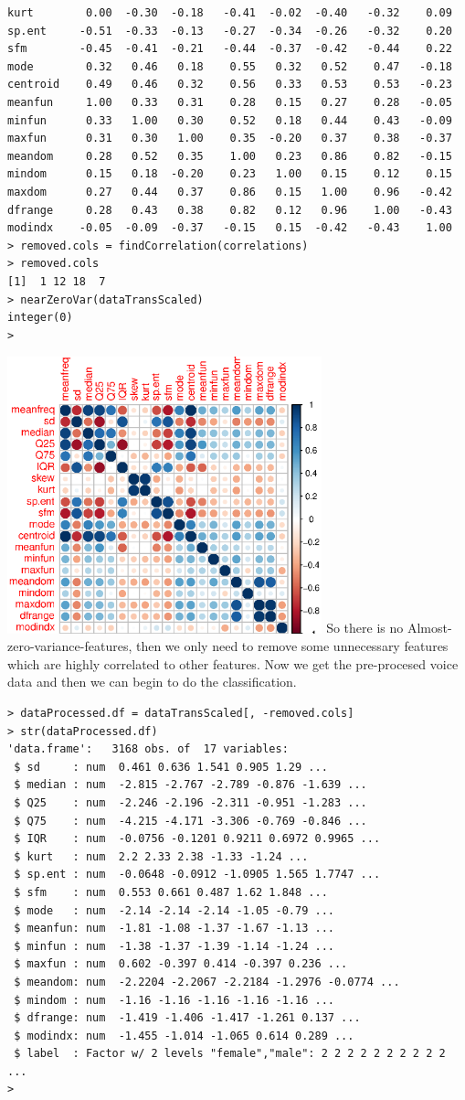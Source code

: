 \documentclass{article}%
\begin{document}
\begin{verbatim}
kurt        0.00  -0.30  -0.18   -0.41  -0.02  -0.40   -0.32    0.09
sp.ent     -0.51  -0.33  -0.13   -0.27  -0.34  -0.26   -0.32    0.20
sfm        -0.45  -0.41  -0.21   -0.44  -0.37  -0.42   -0.44    0.22
mode        0.32   0.46   0.18    0.55   0.32   0.52    0.47   -0.18
centroid    0.49   0.46   0.32    0.56   0.33   0.53    0.53   -0.23
meanfun     1.00   0.33   0.31    0.28   0.15   0.27    0.28   -0.05
minfun      0.33   1.00   0.30    0.52   0.18   0.44    0.43   -0.09
maxfun      0.31   0.30   1.00    0.35  -0.20   0.37    0.38   -0.37
meandom     0.28   0.52   0.35    1.00   0.23   0.86    0.82   -0.15
mindom      0.15   0.18  -0.20    0.23   1.00   0.15    0.12    0.15
maxdom      0.27   0.44   0.37    0.86   0.15   1.00    0.96   -0.42
dfrange     0.28   0.43   0.38    0.82   0.12   0.96    1.00   -0.43
modindx    -0.05  -0.09  -0.37   -0.15   0.15  -0.42   -0.43    1.00
> removed.cols = findCorrelation(correlations)
> removed.cols
[1]  1 12 18  7
> nearZeroVar(dataTransScaled)
integer(0)
> \end{verbatim}
\includegraphics[width = \textwidth, height = 8cm]{Rplot_correlations.eps}
So there is no Almost-zero-variance-features, then we only need to remove some unnecessary features which are highly correlated to other features. Now we get the pre-procesed voice data and then we can begin to do the classification.
\begin{verbatim}
> dataProcessed.df = dataTransScaled[, -removed.cols]
> str(dataProcessed.df)
'data.frame':	3168 obs. of  17 variables:
 $ sd     : num  0.461 0.636 1.541 0.905 1.29 ...
 $ median : num  -2.815 -2.767 -2.789 -0.876 -1.639 ...
 $ Q25    : num  -2.246 -2.196 -2.311 -0.951 -1.283 ...
 $ Q75    : num  -4.215 -4.171 -3.306 -0.769 -0.846 ...
 $ IQR    : num  -0.0756 -0.1201 0.9211 0.6972 0.9965 ...
 $ kurt   : num  2.2 2.33 2.38 -1.33 -1.24 ...
 $ sp.ent : num  -0.0648 -0.0912 -1.0905 1.565 1.7747 ...
 $ sfm    : num  0.553 0.661 0.487 1.62 1.848 ...
 $ mode   : num  -2.14 -2.14 -2.14 -1.05 -0.79 ...
 $ meanfun: num  -1.81 -1.08 -1.37 -1.67 -1.13 ...
 $ minfun : num  -1.38 -1.37 -1.39 -1.14 -1.24 ...
 $ maxfun : num  0.602 -0.397 0.414 -0.397 0.236 ...
 $ meandom: num  -2.2204 -2.2067 -2.2184 -1.2976 -0.0774 ...
 $ mindom : num  -1.16 -1.16 -1.16 -1.16 -1.16 ...
 $ dfrange: num  -1.419 -1.406 -1.417 -1.261 0.137 ...
 $ modindx: num  -1.455 -1.014 -1.065 0.614 0.289 ...
 $ label  : Factor w/ 2 levels "female","male": 2 2 2 2 2 2 2 2 2 2 ...
> \end{verbatim}
\end{document}

